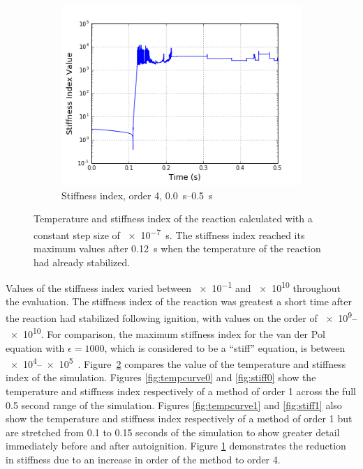 \documentclass[12pt]{ussci}
\begin{document}
\begin{figure}[htbp]
\begin{subfigure}{0.43\textwidth}
        \includegraphics[width=\linewidth]{IndexVals_Order5_1e-07_O5_2.png}
        \caption{Stiffness index, order 4, \SIrange{0.0}{0.5}{\second}}
        \label{fig:stifforder4}
    \end{subfigure}
    \caption{Temperature and stiffness index of the reaction calculated with a constant step size of \SI{e-7}{\second}. 
    The stiffness index reached its maximum values after \SI{0.12}{\second} when the temperature of the reaction had already stabilized.}
    \label{fig:initialdata}
\end{figure}

Values of the stiffness index varied between \num{e-1} and \num{e10} throughout the evaluation. The stiffness index of the reaction was greatest a short time after the reaction had stabilized following ignition, with values on the order of \numrange{e9}{e10}. For comparison, the maximum stiffness index for the van der Pol equation with $\epsilon = 1000$, which is considered to be a ``stiff'' equation, is between \numrange{e4}{e5}~\cite{Shampine1985}. Figure~\ref{fig:initialdata} compares the value of the temperature and stiffness index of the simulation.  Figures \ref{fig:tempcurve0} and \ref{fig:stiff0} show the temperature and stiffness index respectively of a method of order 1 across the full 0.5 second range of the simulation.  Figures \ref{fig:tempcurve1} and \ref{fig:stiff1} also show the temperature and stiffness index respectively of a method of order 1 but are stretched from 0.1 to 0.15 seconds of the simulation to show greater detail immediately before and after autoignition.  Figure \ref{fig:stifforder4} demonstrates the reduction in stiffness due to an increase in order of the method to order 4.
\end{document}
